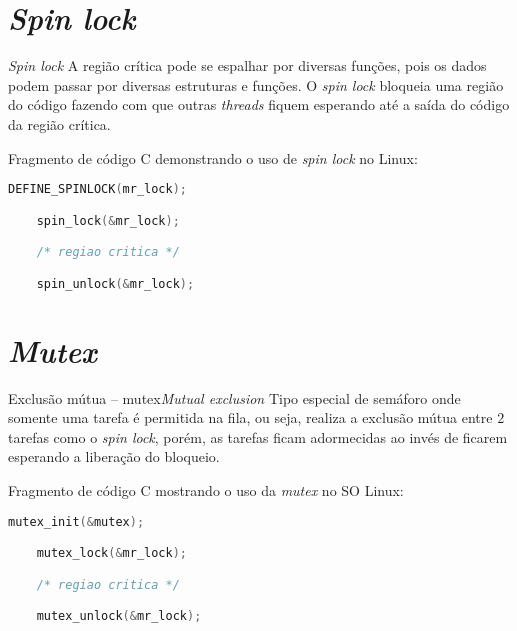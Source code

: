 
\def\thetitle{{\em Spin lock}}
\section{\thetitle}
\begin{frame}[fragile]{\thetitle}
\small
A região crítica pode se espalhar por diversas funções, pois os \alert{dados}
podem passar por diversas estruturas e funções. O \alert{\em spin lock}
bloqueia uma região do código fazendo com que outras {\em threads}
fiquem esperando até a saída do código da região crítica.\\
\bigskip

Fragmento de código C demonstrando o uso de \alert{\em spin lock} no Linux:

  \begin{lstlisting}[language=c,frame=single]
    DEFINE_SPINLOCK(mr_lock);

    spin_lock(&mr_lock);

    /* regiao critica */

    spin_unlock(&mr_lock);
  \end{lstlisting}

\end{frame}


\def\thetitle{\em Mutex}
\section{\thetitle}

\begin{frame}[fragile]{Exclusão mútua -- mutex}{\em Mutual exclusion}
  \small
  Tipo especial de semáforo onde somente uma tarefa é permitida na
  fila, ou seja, realiza a exclusão mútua entre $2$ tarefas como o
  \alert{\em spin lock}, porém, as tarefas ficam \alert{adormecidas} ao invés de
  ficarem esperando a liberação do bloqueio.\\
\bigskip

Fragmento de código C mostrando o uso da \alert{\em mutex} no SO Linux:

  \begin{lstlisting}[language=c,frame=single]
    mutex_init(&mutex);

    mutex_lock(&mr_lock);

    /* regiao critica */

    mutex_unlock(&mr_lock);
  \end{lstlisting}
  
\end{frame}

